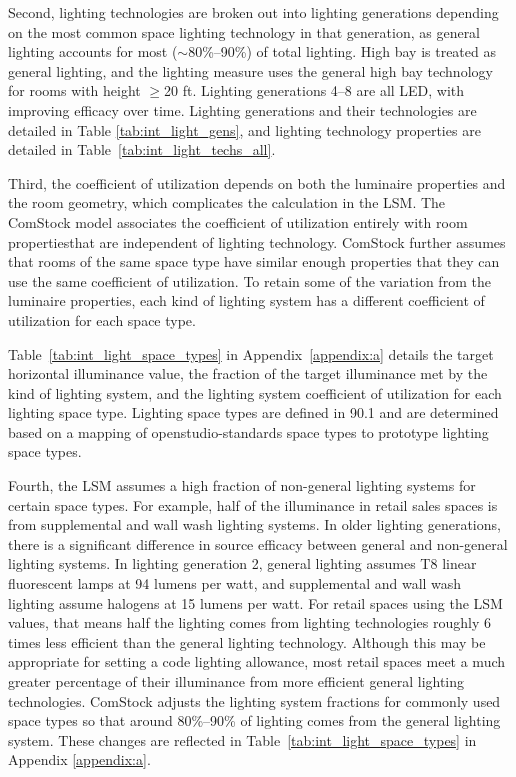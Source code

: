 Second, lighting technologies are broken out into lighting generations depending on the most common space lighting technology in that generation, as general lighting accounts for most ($\sim$80\%--90\%) of total lighting. High bay is treated as general lighting, and the lighting measure uses the general high bay technology for rooms with height $\ge$20 ft. Lighting generations 4--8 are all LED, with improving efficacy over time. Lighting generations and their technologies are detailed in Table \ref{tab:int_light_gens}, and lighting technology properties are detailed in Table~\ref{tab:int_light_techs_all}.

Third, the coefficient of utilization depends on both the luminaire properties and the room geometry, which complicates the calculation in the LSM. The ComStock model associates the coefficient of utilization entirely with room propertiesthat are independent of lighting technology.  ComStock further assumes that rooms of the same space type have similar enough properties that they can use the same coefficient of utilization. To retain some of the variation from the luminaire properties, each kind of lighting system has a different coefficient of utilization for each space type.

Table~\ref{tab:int_light_space_types} in Appendix~\ref{appendix:a} details the target horizontal illuminance value, the fraction of the target illuminance met by the kind of lighting system, and the lighting system coefficient of utilization for each lighting space type. Lighting space types are defined in 90.1 and are determined based on a mapping of openstudio-standards space types to prototype lighting space types.

Fourth, the LSM assumes a high fraction of non-general lighting systems for certain space types. For example, half of the illuminance in retail sales spaces is from supplemental and wall wash lighting systems. In older lighting generations, there is a significant difference in source efficacy between general and non-general lighting systems. In lighting generation 2, general lighting assumes T8 linear fluorescent lamps at 94 lumens per watt, and supplemental and wall wash lighting assume halogens at 15 lumens per watt.  For retail spaces using the LSM values, that means half the lighting comes from lighting technologies roughly 6 times less efficient than the general lighting technology.  Although this may be appropriate for setting a code lighting allowance, most retail spaces meet a much greater percentage of their illuminance from more efficient general lighting technologies.  ComStock adjusts the lighting system fractions for commonly used space types so that around 80\%--90\% of lighting comes from the general lighting system. These changes are reflected in Table~\ref{tab:int_light_space_types} in Appendix \ref{appendix:a}.

